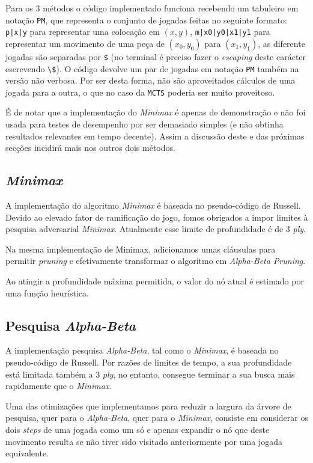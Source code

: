 \documentclass[12pt,a4paper,oneside]{article}
\begin{document}
Para os 3 métodos o código implementado funciona recebendo um
tabuleiro em notação \texttt{PM}, que representa o conjunto de jogadas
feitas no seguinte formato: \texttt{p|x|y} para representar uma
colocação em $(x, y)$, \texttt{m|x0|y0|x1|y1} para representar um
movimento de uma peça de $(x_0, y_0)$ para $(x_1, y_1)$, as diferente
jogadas são separadas por \texttt{\$} (no terminal é preciso fazer o
\textit{escaping} deste carácter escrevendo
\texttt{\textbackslash\$}). O código devolve um par de jogadas em
notação \texttt{PM} também na versão não verbosa. Por ser desta forma,
não são aproveitados cálculos de uma jogada para a outra, o que no
caso da \texttt{MCTS} poderia ser muito proveitoso.

É de notar que a implementação do \textit{Minimax} é apenas de
demonstração e não foi usada para testes de desempenho por ser
demasiado simples (e não obtinha resultados relevantes em tempo
decente). Assim a discussão deste e das próximas secções incidirá mais
nos outros dois métodos.

\subsection{\textit{Minimax}}

A implementação do algoritmo \textit{Minimax} é baseada no pseudo-código de
Russell\cite{Russell:AI:2003}. Devido ao elevado fator de ramificação
do jogo, fomos obrigados a impor limites à pesquisa adversarial
\textit{Minimax}. Atualmente esse limite de profundidade é de 3 \emph{ply}.

Na mesma implementação de Minimax, adicionamos umas cláusulas para
permitir \emph{pruning} e efetivamente transformar o algoritmo em
\emph{Alpha-Beta Pruning}.

Ao atingir a profundidade máxima permitida, o valor do nó atual é
estimado por uma função heurística.

\subsection{Pesquisa \textit{Alpha-Beta}}

A implementação pesquisa \textit{Alpha-Beta}, tal como o
\emph{Minimax}, é baseada no pseudo-código de
Russell\cite{Russell:AI:2003}. Por razões de limites de tempo, a sua
profundidade está limitada também a 3 \emph{ply}, no entanto, consegue
terminar a sua busca mais rapidamente que o \emph{Minimax}.

Uma das otimizações que implementamos para reduzir a largura da árvore
de pesquisa, quer para o \emph{Alpha-Beta}, quer para o
\emph{Minimax}, consiste em considerar os dois \emph{steps} de uma
jogada como um só e apenas expandir o nó que deste movimento resulta
se não tiver sido visitado anteriormente por uma jogada equivalente.
\end{document}
